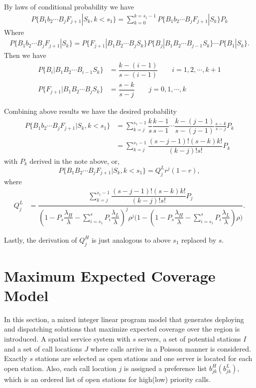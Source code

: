\documentclass{article}
\begin{document}
By laws of conditional probability we have
\begin{align*} 
P \{ B_1b_2 \cdots B_jF_{j+1}|S_k,k<s_1\} = \sum_{k=0}^{k=s_1-1} P \{ B_1b_2 \cdots B_jF_{j+1}|S_k\} P_k
\end{align*}
Where
\begin{align*}
P \{ B_1b_2 \cdots B_jF_{j+1}|S_k\} = P\{F_{j+1}|B_1B_2 \cdots B_j S_k\} P\{B_j|B_1B_2 \cdots B_{j-1}S_k \} \cdots P\{ B_1|S_k\}.
\end{align*}
Then we have
\begin{align*}
P\{B_i|B_1B_2 \cdots B_{i-1}S_k \} &= \dfrac{k-(i-1)}{s-(i-1)} \quad \quad i=1,2, \cdots, k+1 \\
P\{F_{j+1}|B_1B_2 \cdots B_j S_k\} & = \dfrac{s-k}{s-j} \quad \quad  j =0,1,\cdots, k
\end{align*}

Combining above results we have the desired probability
\begin{align*}
P \{ B_1b_2 \cdots B_jF_{j+1}|S_k,k<s_1\} &= \sum_{k=j}^{s_1-1} \dfrac{k}{s} \dfrac{k-1}{s-1}  \cdots \dfrac{k-(j-1)}{s-(j-1)} \frac{s-k}{s-j} P_k\\
 & = \sum_{k=j}^{s_1-1} \dfrac{ (s-j-1)! (s-k) k!}{(k-j)!s!} P_k
\end{align*}
with $P_k$ derived in the note above, or, 
\[ P \{ B_1 B_2 \cdots B_j F_{j+1}|S_k,k<s_1\} = Q_j^L r^j (1-r),\]
where
\begin{align*}
 Q_j^L  & = \dfrac{ \sum_{k=j}^{s_1-1} \dfrac{ (s-j-1)! (s-k) k!}{(k-j)!s!} P_j }
      { (1-P_s \dfrac{\lambda_H}{\lambda}-\sum_{i=s_1}^s P_{i} \dfrac{\lambda_L}{\lambda})^j \rho^j  \big( 1-(1-P_s \dfrac{\lambda_H}{\lambda}-\sum_{i=s_1}^s P_{i} \dfrac{\lambda_L}{\lambda})\rho \big) }.
\end{align*}

Lastly, the derivation of $Q_j^H$ is just analogous to above $s_1$ replaced by $s$.





\section{Maximum Expected Coverage Model}
In this section, a mixed integer linear program model that generates deploying and dispatching solutions that maximize expected coverage over the region is introduced. A spatial service system with $s$ servers, a set of potential stations $I$ and a set of call locations $J$ where calls arrive in a Poisson manner is considered. Exactly $s$ stations are selected as open stations and one server is located for each open station. Also, each call location $j$ is assigned a preference list $b^H_{jk}(b^L_{jk})$, which is an ordered list of open stations for high(low) priority calls.
\end{document}
